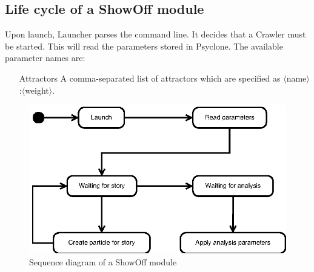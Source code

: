 \subsection{Life cycle of a ShowOff module}

Upon launch, Launcher parses the command line. It decides that a Crawler must
be started. This will read the parameters stored in Psyclone. The available parameter names are:

\begin{itemize}
 \item[Attractors] A comma-separated list of attractors which are specified as
                   $\langle$name$\rangle$:$\langle$weight$\rangle$.
\end{itemize}

\begin{figure}[htp]
  \centering
  \includegraphics{image/sequence-diagram-showoff}
  \caption{Sequence diagram of a ShowOff module}
\end{figure}
